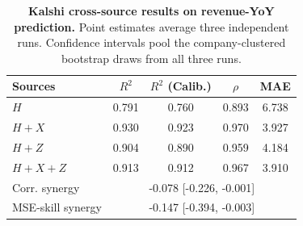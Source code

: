 \begin{table}[t]
\centering
\caption{\textbf{Kalshi cross-source results on revenue-YoY prediction.}
Point estimates average three independent runs. Confidence intervals pool the
company-clustered bootstrap draws from all three runs.}
\label{tab:kalshi_synergy}
\begin{tabular}{lcccc}
\toprule
Sources & $R^2$ & $R^2$ (Calib.) & $\rho$ & MAE \\
\midrule
$H$ & 0.791 & 0.760 & 0.893 & 6.738 \\
$H+X$ & 0.930 & 0.923 & 0.970 & 3.927 \\
$H+Z$ & 0.904 & 0.890 & 0.959 & 4.184 \\
$H+X+Z$ & 0.913 & 0.912 & 0.967 & 3.910 \\
\midrule
Corr. synergy & \multicolumn{4}{c}{-0.078 [-0.226, -0.001]} \\
MSE-skill synergy & \multicolumn{4}{c}{-0.147 [-0.394, -0.003]} \\
\bottomrule
\end{tabular}
\end{table}
